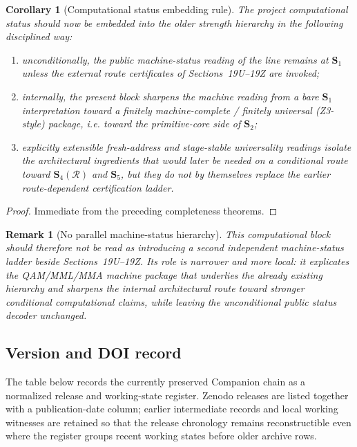 \documentclass[12pt,a4paper]{article}
\newtheorem{corollary}[theorem]{Corollary}
\newtheorem{remark}[theorem]{Remark}
\begin{document}
\begin{corollary}[Computational status embedding rule]\label{cor:computational-status-upgrade-rule-computational-layer}
The project computational status should now be embedded into the older strength hierarchy in the following disciplined way:
\begin{enumerate}[leftmargin=2em]
 \item unconditionally, the public machine-status reading of the line remains at \(\mathbf S_1\) unless the external route certificates of Sections~19U--19Z are invoked;
 \item internally, the present block sharpens the machine reading from a bare \(\mathbf S_1\) interpretation toward a finitely machine-complete / finitely universal (Z3-style) package, i.e. toward the primitive-core side of \(\mathbf S_2\);
 \item explicitly extensible fresh-address and stage-stable universality readings isolate the architectural ingredients that would later be needed on a conditional route toward \(\mathbf S_4(\mathcal R)\) and \(\mathbf S_5\), but they do not by themselves replace the earlier route-dependent certification ladder.
\end{enumerate}
\end{corollary}

\begin{proof}
Immediate from the preceding completeness theorems.
\end{proof}

\begin{remark}[No parallel machine-status hierarchy]\label{rem:no-parallel-machine-status-hierarchy-computational-layer}
This computational block should therefore not be read as introducing a second independent machine-status ladder beside Sections~19U--19Z. Its role is narrower and more local: it explicates the QAM/MML/MMA machine package that underlies the already existing hierarchy and sharpens the internal architectural route toward stronger conditional computational claims, while leaving the unconditional public status decoder unchanged.
\end{remark}

\subsection*{Version and DOI record}
The table below records the currently preserved Companion chain as a normalized release and working-state register. Zenodo releases are listed together with a publication-date column; earlier intermediate records and local working witnesses are retained so that the release chronology remains reconstructible even where the register groups recent working states before older archive rows.
\end{document}
